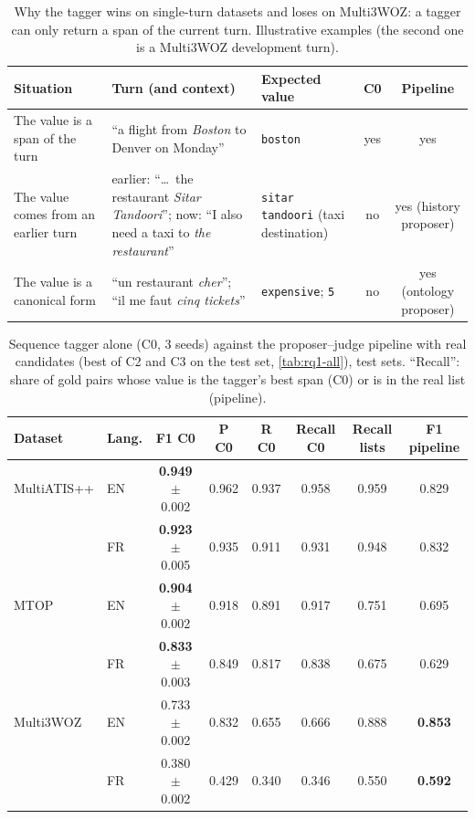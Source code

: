 \begin{table}[pos=t]
\centering
\small
\caption{Why the tagger wins on single-turn datasets and loses on Multi3WOZ: a tagger can only return a span of the current turn. Illustrative examples (the second one is a Multi3WOZ development turn).}
\label{tab:c0-cases}
\begin{tabular}{@{}p{3.2cm}p{5.4cm}p{2.4cm}cc@{}}
\toprule
Situation & Turn (and context) & Expected value & C0 & Pipeline \\
\midrule
The value is a span of the turn & ``a flight from \emph{Boston} to Denver on Monday'' & \texttt{boston} & yes & yes \\
The value comes from an earlier turn & earlier: ``\ldots\ the restaurant \emph{Sitar Tandoori}''; now: ``I also need a taxi to \emph{the restaurant}'' & \texttt{sitar tandoori} (taxi destination) & no & yes (history proposer) \\
The value is a canonical form & ``un restaurant \emph{cher}''; ``il me faut \emph{cinq tickets}'' & \texttt{expensive}; \texttt{5} & no & yes (ontology proposer) \\
\bottomrule
\end{tabular}
\end{table}

\begin{table}[pos=t]
\centering
\small
\caption{Sequence tagger alone (C0, 3 seeds) against the proposer--judge pipeline with real candidates (best of C2 and C3 on the test set, \cref{tab:rq1-all}), test sets. ``Recall'': share of gold pairs whose value is the tagger's best span (C0) or is in the real list (pipeline).}
\label{tab:c0}
\begin{tabular}{@{}llcccccc@{}}
\toprule
Dataset & Lang. & F1 C0 & P C0 & R C0 & Recall C0 & Recall lists & F1 pipeline \\
\midrule
MultiATIS++ & EN & \textbf{0.949} $\pm$ 0.002 & 0.962 & 0.937 & 0.958 & 0.959 & 0.829 \\
            & FR & \textbf{0.923} $\pm$ 0.005 & 0.935 & 0.911 & 0.931 & 0.948 & 0.832 \\
MTOP & EN & \textbf{0.904} $\pm$ 0.002 & 0.918 & 0.891 & 0.917 & 0.751 & 0.695 \\
     & FR & \textbf{0.833} $\pm$ 0.003 & 0.849 & 0.817 & 0.838 & 0.675 & 0.629 \\
Multi3WOZ & EN & 0.733 $\pm$ 0.002 & 0.832 & 0.655 & 0.666 & 0.888 & \textbf{0.853} \\
          & FR & 0.380 $\pm$ 0.002 & 0.429 & 0.340 & 0.346 & 0.550 & \textbf{0.592} \\
\bottomrule
\end{tabular}
\end{table}


